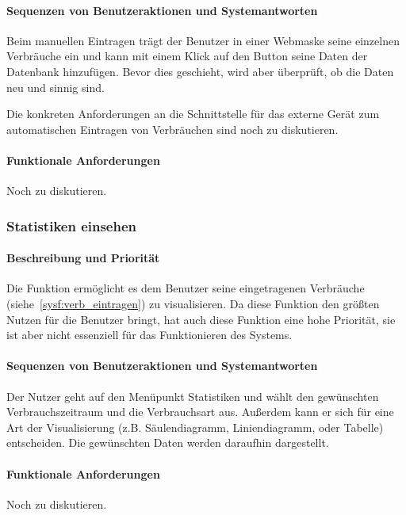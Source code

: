 \paragraph{Sequenzen von Benutzeraktionen und Systemantworten}
Beim manuellen Eintragen trägt der Benutzer in einer Webmaske seine einzelnen Verbräuche ein und kann mit einem Klick
auf den Button  seine Daten der Datenbank hinzufügen.
Bevor dies geschieht, wird aber überprüft, ob die Daten neu und sinnig sind.

Die konkreten Anforderungen an die Schnittstelle für das externe Gerät zum automatischen Eintragen von Verbräuchen
sind noch zu diskutieren.

\paragraph{Funktionale Anforderungen}
Noch zu diskutieren. %

\subsubsection{Statistiken einsehen}
\paragraph{Beschreibung und Priorität}
Die Funktion ermöglicht es dem Benutzer seine eingetragenen Verbräuche (siehe~\ref{sysf:verb_eintragen})
zu visualisieren.
Da diese Funktion den größten Nutzen für die Benutzer bringt, hat auch diese Funktion eine hohe Priorität,
sie ist aber nicht essenziell für das Funktionieren des Systems.

\paragraph{Sequenzen von Benutzeraktionen und Systemantworten}

Der Nutzer geht auf den Menüpunkt Statistiken und wählt den gewünschten Verbrauchszeitraum und die Verbrauchsart aus.
Außerdem kann er sich für eine Art der Visualisierung (z.B. Säulendiagramm, Liniendiagramm, oder Tabelle) entscheiden.
Die gewünschten Daten werden daraufhin dargestellt.

\paragraph{Funktionale Anforderungen}
Noch zu diskutieren.


